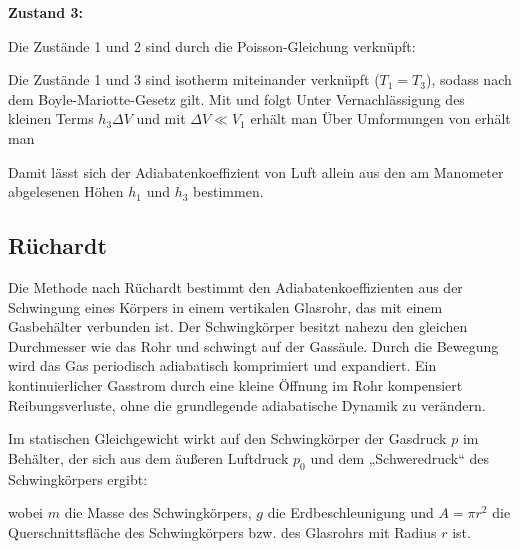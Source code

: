 \textbf{Zustand 3:}


Die Zustände 1 und 2 sind durch die Poisson-Gleichung  verknüpft:


Die Zustände 1 und 3 sind isotherm miteinander verknüpft ($T_1 = T_3$), sodass nach dem Boyle-Mariotte-Gesetz
gilt. Mit  und  folgt
Unter Vernachlässigung des kleinen Terms \(h_3 \Delta V\) und mit \(\Delta V \ll V_1\) erhält man
Über Umformungen von  erhält man


Damit lässt sich der Adiabatenkoeffizient von Luft allein aus den am Manometer abgelesenen Höhen \(h_1\) und \(h_3\) bestimmen.

\subsection{Rüchardt}

Die Methode nach Rüchardt bestimmt den Adiabatenkoeffizienten aus der Schwingung eines Körpers in einem vertikalen Glasrohr, das mit einem Gasbehälter verbunden ist. Der Schwingkörper besitzt nahezu den gleichen Durchmesser wie das Rohr und schwingt auf der Gassäule. Durch die Bewegung wird das Gas periodisch adiabatisch komprimiert und expandiert. Ein kontinuierlicher Gasstrom durch eine kleine Öffnung im Rohr kompensiert Reibungsverluste, ohne die grundlegende adiabatische Dynamik zu verändern.

Im statischen Gleichgewicht wirkt auf den Schwingkörper der Gasdruck \(p\) im Behälter, der sich aus dem äußeren Luftdruck \(p_0\) und dem „Schweredruck“ des Schwingkörpers ergibt:


wobei \(m\) die Masse des Schwingkörpers, \(g\) die Erdbeschleunigung und \(A = \pi r^2\) die Querschnittsfläche des Schwingkörpers bzw. des Glasrohrs mit Radius \(r\) ist.

